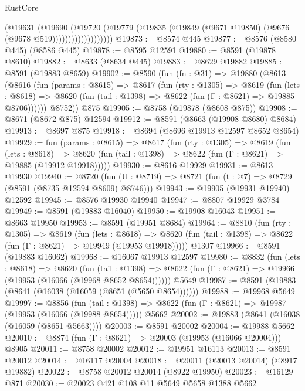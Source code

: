 \begin{lexlean}{RustCore}
\begin{coremodule}
                          (@19631
                            (@19690
                              (@19720
                                (@19779
                                  (@19835
                                    (@19849 (@9671 @19850) (@9676 (@9678 @519)))))))))))))))))))
@19873 := @8574 @445
@19877 := @8576 (@8580 @445) (@8586 @445)
@19878 := @8595 @12591
@19880 := @8591 (@19878 @8610)
@19882 := @8633 (@8634 @445)
@19883 := @8629 @19882
@19885 := @8591 (@19883 @8659)
@19902 := @8590
    (fun (fn : @31) =>
    @19880
      (@8613
        (@8616
          (fun (params : @8615) =>
          @8617
            (fun (rty : @1305) =>
            @8619
              (fun (lets : @8618) =>
              @8620 (fun (tail : @1398) => @8622 (fun (Γ : @8621) => @19885 @8706))))))
        @8752))
    @875
@19905 := @8758 (@19878 (@8608 @875))
@19908 := @8671 (@8672 @875) @12594
@19912 := @8591 (@8663 (@19908 @8680) @8684)
@19913 := @8697 @875
@19918 := @8694 (@8696 @19913 @12597 @8652 @8654)
@19929 := fun (params : @8615) =>
  @8617
    (fun (rty : @1305) =>
    @8619
      (fun (lets : @8618) =>
      @8620 (fun (tail : @1398) => @8622 (fun (Γ : @8621) => @19885 (@19912 @19918)))))
@19930 := @8616 @19929
@19931 := @8613 @19930
@19940 := @8720
    (fun (U : @8719) => @8721 (fun (t : @7) => @8729 (@8591 (@8735 @12594 @8609) @8746)))
@19943 := @19905 (@19931 @19940) @12592
@19945 := @8576 @19930 @19940
@19947 := @8807 @19929 @3784
@19949 := @8591 (@19883 @16040)
@19950 := @19908 @16043
@19951 := @8663 @19950
@19953 := @8591 (@19951 @8684)
@19964 := @8810
    (fun (rty : @1305) =>
    @8619
      (fun (lets : @8618) =>
      @8620 (fun (tail : @1398) => @8622 (fun (Γ : @8621) => @19949 (@19953 @19918)))))
    @1307
@19966 := @8591 (@19883 @16062)
@19968 := @16067 @19913 @12597
@19980 := @8832
    (fun (lets : @8618) =>
    @8620
      (fun (tail : @1398) =>
      @8622 (fun (Γ : @8621) => @19966 (@19953 (@16066 (@19968 @8652 @8654))))))
    @5649
@19987 := @8591 (@19883 (@8641 (@16038 (@16059 (@8651 (@5650 @8654))))))
@19988 := @19968 @5649
@19997 := @8856
    (fun (tail : @1398) => @8622 (fun (Γ : @8621) => @19987 (@19953 (@16066 (@19988 @8654)))))
    @5662
@20002 := @19883 (@8641 (@16038 (@16059 (@8651 @5663))))
@20003 := @8591 @20002
@20004 := @19988 @5662
@20010 := @8874 (fun (Γ : @8621) => @20003 (@19953 (@16066 @20004))) @8905
@20011 := @8758 @20002
@20012 := @19951 @16113
@20013 := @8591 @20012
@20014 := @16117 @20004
@20018 := @20011 (@20013 @20014) (@8917 @19882)
@20022 := @8758 @20012 @20014 (@8922 @19950)
@20023 := @16129 @871
@20030 := @20023 @421 @108 @11 @5649 @5658 @1388 @5662

\end{coremodule}
\end{lexlean}
